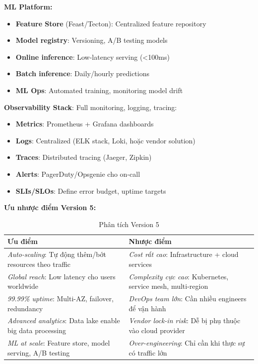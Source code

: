 \noindent\textbf{ML Platform:}
\begin{itemize}
    \item \textbf{Feature Store} (Feast/Tecton): Centralized feature repository
    \item \textbf{Model registry}: Versioning, A/B testing models
    \item \textbf{Online inference}: Low-latency serving (<100ms)
    \item \textbf{Batch inference}: Daily/hourly predictions
    \item \textbf{ML Ops}: Automated training, monitoring model drift
\end{itemize}

\textbf{Observability Stack}:
Full monitoring, logging, tracing:
\begin{itemize}
    \item \textbf{Metrics}: Prometheus + Grafana dashboards
    \item \textbf{Logs}: Centralized (ELK stack, Loki, hoặc vendor solution)
    \item \textbf{Traces}: Distributed tracing (Jaeger, Zipkin)
    \item \textbf{Alerts}: PagerDuty/Opsgenie cho on-call
    \item \textbf{SLIs/SLOs}: Define error budget, uptime targets
\end{itemize}

\noindent\textbf{Ưu nhược điểm Version 5:}

\begin{table}[H]
\centering
\caption{Phân tích Version 5}
\begin{tabular}{|p{6.5cm}|p{6.5cm}|}
\hline
\textbf{Ưu điểm} & \textbf{Nhược điểm} \\
\hline
\textit{Auto-scaling}: Tự động thêm/bớt resources theo traffic & \textit{Cost rất cao}: Infrastructure + cloud services \\
\hline
\textit{Global reach}: Low latency cho users worldwide & \textit{Complexity cực cao}: Kubernetes, service mesh, multi-region \\
\hline
\textit{99.99\% uptime}: Multi-AZ, failover, redundancy & \textit{DevOps team lớn}: Cần nhiều engineers để vận hành \\
\hline
\textit{Advanced analytics}: Data lake enable big data processing & \textit{Vendor lock-in risk}: Dễ bị phụ thuộc vào cloud provider \\
\hline
\textit{ML at scale}: Feature store, model serving, A/B testing & \textit{Over-engineering}: Chỉ cần khi thực sự có traffic lớn \\
\hline
\end{tabular}
\end{table}

